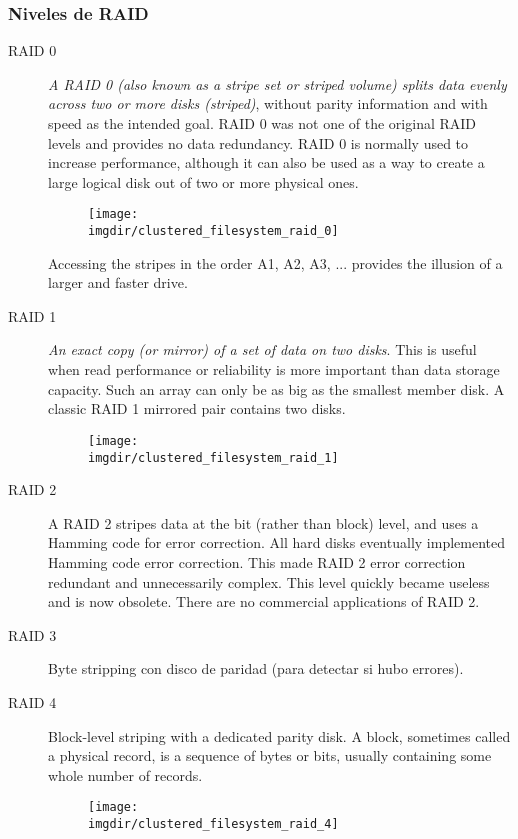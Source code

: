 \documentclass[a4paper, twoside]{article}
\newcommand{\imgdir}{../resources/images} %
\begin{document}
\subsubsection{Niveles de RAID}
\begin{description}
	\item[RAID 0] \emph{A RAID 0 (also known as a stripe set or striped volume) splits data evenly across two or more disks (striped)}, without parity information and with speed as the intended goal. RAID 0 was not one of the original RAID levels and provides no data redundancy. RAID 0 is normally used to increase performance, although it can also be used as a way to create a large logical disk out of two or more physical ones.
	\begin{figure}[H]
		\centering
		\texttt{[image: \\imgdir/clustered\_filesystem\_raid\_0]}
		\label{fig:clustered_filesystem_raid_0}
	\end{figure}
	Accessing the stripes in the order A1, A2, A3, ... provides the illusion of a larger and faster drive.

	\item[RAID 1] \emph{An exact copy (or mirror) of a set of data on two disks}. This is useful when read performance or reliability is more important than data storage capacity. Such an array can only be as big as the smallest member disk. A classic RAID 1 mirrored pair contains two disks.
	\begin{figure}[H]
		\centering
		\texttt{[image: \\imgdir/clustered\_filesystem\_raid\_1]}
		\label{fig:clustered_filesystem_raid_1}
	\end{figure}

	\item[RAID 2] A RAID 2 stripes data at the bit (rather than block) level, and uses a Hamming code for error correction. All hard disks eventually implemented Hamming code error correction. This made RAID 2 error correction redundant and unnecessarily complex. This level quickly became useless and is now obsolete. There are no commercial applications of RAID 2.

	\item[RAID 3] Byte stripping con disco de paridad (para detectar si hubo errores).

	\item[RAID 4] Block-level striping with a dedicated parity disk. A block, sometimes called a physical record, is a sequence of bytes or bits, usually containing some whole number of records.
	\begin{figure}[H]
		\centering
		\texttt{[image: \\imgdir/clustered\_filesystem\_raid\_4]}
		\label{fig:clustered_filesystem_raid_4}
	\end{figure}


\end{description}
\end{document}
